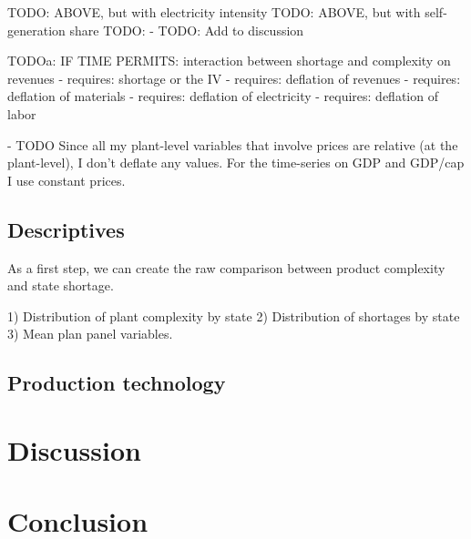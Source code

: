 \documentclass[11pt]{article}
\begin{document}
TODO: ABOVE, but with electricity intensity
TODO: ABOVE, but with self-generation share
TODO: 
 - TODO: Add to discussion

TODOa: IF TIME PERMITS: interaction between shortage and complexity on revenues - requires: shortage or the IV
 - requires: deflation of revenues
 - requires: deflation of materials
 - requires: deflation of electricity
 - requires: deflation of labor

 - TODO Since all my plant-level variables that involve prices are relative (at the plant-level), I don't deflate any values. For the time-series on GDP and GDP/cap I use constant prices.



\subsection{Descriptives}%
\label{sub:descriptives}

As a first step, we can create the raw comparison between product complexity and state shortage.

1) Distribution of plant complexity by state
2) Distribution of shortages by state
3) Mean plan panel variables.

\subsection{Production technology}%
\label{sub:production_technology}


\newpage

\section{Discussion}%
\label{sec:discussion}


\newpage

\section{Conclusion}%
\label{sec:conclusion}

\end{document}
